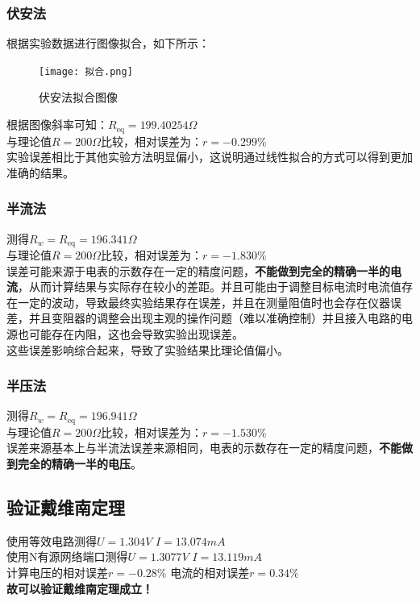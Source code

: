 \documentclass[dvipsnames, svgnames,a4paper,11pt]{article}
\begin{document}
	 \subsubsection{伏安法} 
	  根据实验数据进行图像拟合，如下所示：
	  \begin{figure}[{H}]
		\centering
		\texttt{[image: 拟合.png]}
		\caption{伏安法拟合图像}
		\label{}
	  \end{figure}
	  根据图像斜率可知：$R_{\mathrm{eq}}=199.40254\Omega $
	  \\ \indent 与理论值$R=200 \Omega $比较，相对误差为：$r=-0.299\%$\\
	  \indent 实验误差相比于其他实验方法明显偏小，这说明通过线性拟合的方式可以得到更加准确的结果。
	  \subsubsection{半流法}
	  测得$R_w=R_{\mathrm{eq}}=196.341 \Omega $
\\ \indent 与理论值$R=200 \Omega $比较，相对误差为：$r=-1.830\%$\\
\indent 误差可能来源于电表的示数存在一定的精度问题，\textbf{不能做到完全的精确一半的电流}，从而计算结果与实际存在较小的差距。并且可能由于调整目标电流时电流值存在一定的波动，导致最终实验结果存在误差，并且在测量阻值时也会存在仪器误差，并且变阻器的调整会出现主观的操作问题（难以准确控制）并且接入电路的电源也可能存在内阻，这也会导致实验出现误差。\\
\indent 这些误差影响综合起来，导致了实验结果比理论值偏小。
\subsubsection{半压法} 
 测得$R_w=R_{\mathrm{eq}}=196.941 \Omega $
 \\\indent 与理论值$R=200 \Omega $比较，相对误差为：$r=-1.530\%$\\
 \indent 误差来源基本上与半流法误差来源相同，电表的示数存在一定的精度问题，\textbf{不能做到完全的精确一半的电压}。\\

	
	\subsection{验证戴维南定理}
	使用等效电路测得$U=1.304V $   $I=13.074mA$\\
	\indent 使用N有源网络端口测得$U=1.3077V$   $ I=13.119mA$\\
	\indent 计算电压的相对误差$r=-0.28\%$ 电流的相对误差$r=0.34\%$\\
    \indent \textbf{\Large{故可以验证戴维南定理成立！}}
\end{document}
